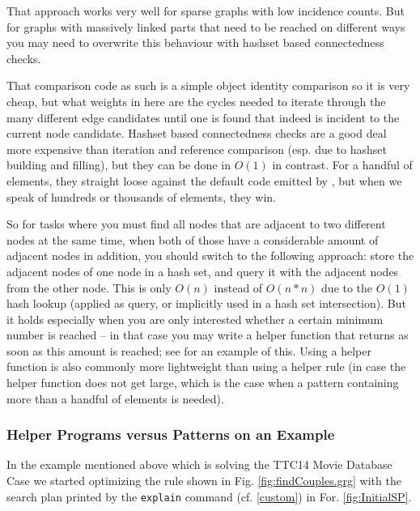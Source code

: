 That approach works very well for sparse graphs with low incidence counts.
But for graphs with massively linked parts that need to be reached on different ways you may need to overwrite this behaviour with hashset based connectedness checks.

That comparison code as such is a simple object identity comparison so it is very cheap, 
but what weights in here are the cycles needed to iterate through the many different edge candidates until one is found that indeed is incident to the current node candidate.
Hashset based connectedness checks are a good deal more expensive than iteration and reference comparison (esp. due to hashset building and filling), but they can be done in $O(1)$ in contrast.
For a handful of elements, they straight loose against the default code emitted by \GrG, but when we speak of hundreds or thousands of elements, they win.

So for tasks where you must find all nodes that are adjacent to two different nodes at the same time, when both of those have a considerable amount of adjacent nodes in addition, you should switch to the following approach:
store the adjacent nodes of one node in a hash set, and query it with the adjacent nodes from the other node.
This is only $O(n)$ instead of $O(n*n)$ due to the $O(1)$ hash lookup (applied as query, or implicitly used in a hash set intersection).
But it holds especially when you are only interested whether a certain minimum number is reached -- in that case you may write a helper function that returns as soon as this amount is reached; see \cite{MovieDatabase} for an example of this.
Using a helper function is also commonly more lightweight than using a helper rule (in case the helper function does not get large, which is the case when a pattern containing more than a handful of elements is needed).

\subsubsection*{Helper Programs versus Patterns on an Example}

In the example \cite{MovieDatabase} mentioned above which is solving the TTC14 Movie Database Case \cite{MovieDatabaseCase} we started optimizing the rule shown in Fig. \ref{fig:findCouples.grg}
with the search plan printed by the \texttt{explain} command (cf. \ref{custom}) in For. \ref{fig:InitialSP}.

